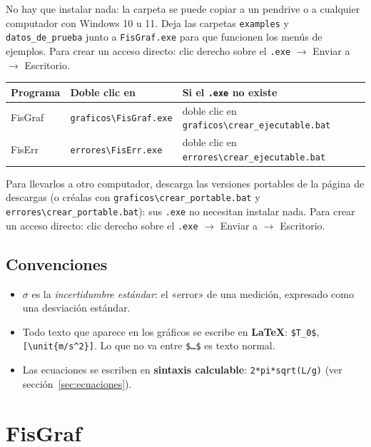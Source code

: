 \documentclass[11pt,a4paper]{article}
\newif\iffiserr
\newcommand{\code}[1]{\texttt{#1}}
\newcommand{\bs}{\textbackslash}
\newcommand{\menu}[1]{\textsf{#1}}
\begin{document}
No hay que instalar nada: la carpeta se puede copiar a un pendrive o a cualquier computador con Windows 10 u 11. Deja las carpetas \code{examples} y \code{datos\_de\_prueba} junto a \code{FisGraf.exe} para que funcionen los menús de ejemplos. Para crear un acceso directo: clic derecho sobre el \code{.exe} $\rightarrow$ \menu{Enviar a} $\rightarrow$ \menu{Escritorio}.
\else
\begin{tabularx}{\linewidth}{@{}llX@{}}\toprule
\textbf{Programa} & \textbf{Doble clic en} & \textbf{Si el \code{.exe} no existe}\\\midrule
FisGraf & \code{graficos\bs FisGraf.exe} & doble clic en \code{graficos\bs crear\_ejecutable.bat}\\
FisErr & \code{errores\bs FisErr.exe} & doble clic en \code{errores\bs crear\_ejecutable.bat}\\\bottomrule
\end{tabularx}

Para llevarlos a otro computador, descarga las versiones portables de la página de descargas (o créalas con \code{graficos\bs crear\_portable.bat} y \code{errores\bs crear\_portable.bat}): sus \code{.exe} no necesitan instalar nada. Para crear un acceso directo: clic derecho sobre el \code{.exe} $\rightarrow$ \menu{Enviar a} $\rightarrow$ \menu{Escritorio}.
\fi

\subsection{Convenciones}

\begin{itemize}
  \item $\sigma$ es la \emph{incertidumbre estándar}: el «error» de una medición, expresado como una desviación estándar.
  \item Todo texto que aparece en los gráficos se escribe en \textbf{LaTeX}: \code{\$T\_0\$}, \code{[\bs unit\{m/s\^{}2\}]}. Lo que no va entre \code{\$…\$} es texto normal.
  \item Las ecuaciones se escriben en \textbf{sintaxis calculable}: \code{2*pi*sqrt(L/g)} (ver sección~\ref{sec:ecuaciones}).
\end{itemize}
\fi

\iffiserr\else
\section{FisGraf}
\end{document}
